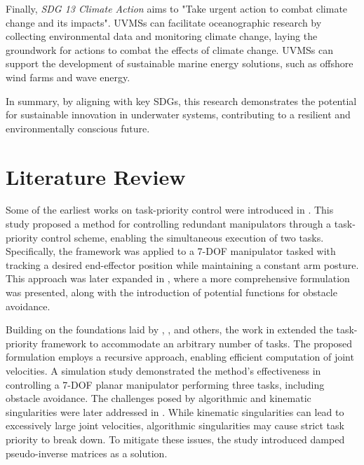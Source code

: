 Finally, \emph{SDG 13 Climate Action} aims to "Take urgent action to combat climate
change and its impacts". UVMSs can facilitate oceanographic research by collecting
environmental data and monitoring climate change, laying the groundwork for actions
to combat the effects of climate change. UVMSs can support the development of
sustainable marine energy solutions, such as offshore wind farms and wave energy.

In summary, by aligning with key SDGs, this research demonstrates the potential
for sustainable innovation in underwater systems, contributing to a resilient 
and environmentally conscious future.

\newpage
\section{Literature Review}

Some of the earliest works on task-priority control were introduced in 
\cite{hanafusa1981}. This study proposed a method for controlling redundant 
manipulators through a task-priority control scheme, enabling the simultaneous 
execution of two tasks. Specifically, the framework was applied to a 7-DOF 
manipulator tasked with tracking a desired end-effector position while 
maintaining a constant arm posture. This approach was later expanded in 
\cite{nakamura1987}, where a more comprehensive formulation was presented, 
along with the introduction of potential functions for obstacle avoidance.

Building on the foundations laid by \cite{hanafusa1981}, \cite{nakamura1987}, 
and others, the work in \cite{siciliano1991} extended the task-priority 
framework to accommodate an arbitrary number of tasks. The proposed formulation 
employs a recursive approach, enabling efficient computation of joint 
velocities. A simulation study demonstrated the method's effectiveness in 
controlling a 7-DOF planar manipulator performing three tasks, including 
obstacle avoidance. The challenges posed by algorithmic and kinematic 
singularities were later addressed in \cite{chiaverini1997}. While kinematic 
singularities can lead to excessively large joint velocities, algorithmic 
singularities may cause strict task priority to break down. To mitigate these 
issues, the study introduced damped pseudo-inverse matrices as a solution.

